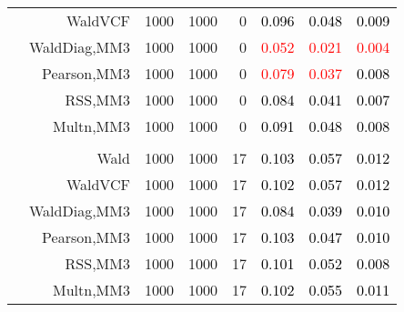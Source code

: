 \documentclass[
]{article}
\begin{document}
\begin{table}[H]
{\begin{tabular}[t]{lrrrrrrr}
\hspace{1em} & WaldVCF & 1000 & 1000 & 0 & \textcolor{black}{0.096} & \textcolor{black}{0.048} & \textcolor{black}{0.009}\\

\hspace{1em} & WaldDiag,MM3 & 1000 & 1000 & 0 & \textcolor{red}{0.052} & \textcolor{red}{0.021} & \textcolor{red}{0.004}\\

\hspace{1em} & Pearson,MM3 & 1000 & 1000 & 0 & \textcolor{red}{0.079} & \textcolor{red}{0.037} & \textcolor{black}{0.008}\\

\hspace{1em} & RSS,MM3 & 1000 & 1000 & 0 & \textcolor{black}{0.084} & \textcolor{black}{0.041} & \textcolor{black}{0.007}\\

\hspace{1em} & Multn,MM3 & 1000 & 1000 & 0 & \textcolor{black}{0.091} & \textcolor{black}{0.048} & \textcolor{black}{0.008}\\
\cmidrule{1-8}
\addlinespace[0.3em]
\multicolumn{8}{l}{\textbf{3F 15V}}\\
\hspace{1em} & Wald & 1000 & 1000 & 17 & \textcolor{black}{0.103} & \textcolor{black}{0.057} & \textcolor{black}{0.012}\\

\hspace{1em} & WaldVCF & 1000 & 1000 & 17 & \textcolor{black}{0.102} & \textcolor{black}{0.057} & \textcolor{black}{0.012}\\

\hspace{1em} & WaldDiag,MM3 & 1000 & 1000 & 17 & \textcolor{black}{0.084} & \textcolor{black}{0.039} & \textcolor{black}{0.010}\\

\hspace{1em} & Pearson,MM3 & 1000 & 1000 & 17 & \textcolor{black}{0.103} & \textcolor{black}{0.047} & \textcolor{black}{0.010}\\

\hspace{1em} & RSS,MM3 & 1000 & 1000 & 17 & \textcolor{black}{0.101} & \textcolor{black}{0.052} & \textcolor{black}{0.008}\\

\hspace{1em} & Multn,MM3 & 1000 & 1000 & 17 & \textcolor{black}{0.102} & \textcolor{black}{0.055} & \textcolor{black}{0.011}\\
\bottomrule
\end{tabular}}
\endgroup{}
\end{table}
\end{document}
